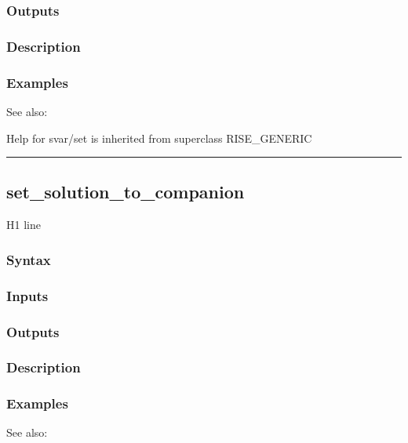 \documentclass[letterpaper,10pt,english]{sphinxmanual}
\begin{document}
\subsubsection{Outputs}
\label{classes/models/@svar/svar:id104}

\subsubsection{Description}
\label{classes/models/@svar/svar:id105}

\subsubsection{Examples}
\label{classes/models/@svar/svar:id106}
See also:

Help for svar/set is inherited from superclass RISE\_GENERIC


\bigskip\hrule{}\bigskip



\subsection{set\_solution\_to\_companion}
\label{classes/models/@svar/svar:id107}\label{classes/models/@svar/svar:set-solution-to-companion}
H1 line


\subsubsection{Syntax}
\label{classes/models/@svar/svar:id108}

\subsubsection{Inputs}
\label{classes/models/@svar/svar:id109}

\subsubsection{Outputs}
\label{classes/models/@svar/svar:id110}

\subsubsection{Description}
\label{classes/models/@svar/svar:id111}

\subsubsection{Examples}
\label{classes/models/@svar/svar:id112}
See also:
\end{document}

